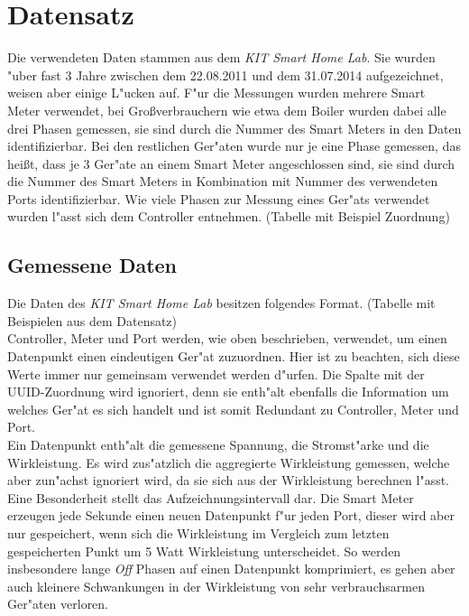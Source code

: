 \section{Datensatz}
\label{Datensatz}

Die verwendeten Daten stammen aus dem \textit{KIT Smart Home Lab}. Sie wurden "uber fast 3 Jahre zwischen dem 22.08.2011 und dem 31.07.2014 aufgezeichnet, weisen aber einige L"ucken auf. F"ur die Messungen wurden mehrere Smart Meter verwendet, bei Gro{\ss}verbrauchern wie etwa dem Boiler wurden dabei alle drei Phasen gemessen, sie sind durch die Nummer des Smart Meters in den Daten identifizierbar. Bei den restlichen Ger"aten wurde nur je eine Phase gemessen, das hei{\ss}t, dass je 3 Ger"ate an einem Smart Meter angeschlossen sind, sie sind durch die Nummer des Smart Meters in Kombination mit Nummer des verwendeten Ports identifizierbar. Wie viele Phasen zur Messung eines Ger"ats verwendet wurden l"asst sich dem Controller entnehmen. (Tabelle mit Beispiel Zuordnung)


\subsection{Gemessene Daten}
\label{Gemessene Daten}

Die Daten des \textit{KIT Smart Home Lab} besitzen folgendes Format. (Tabelle mit Beispielen aus dem Datensatz) \\

Controller, Meter und Port werden, wie oben beschrieben, verwendet, um einen Datenpunkt einen eindeutigen Ger"at zuzuordnen. Hier ist zu beachten, sich diese Werte immer nur gemeinsam verwendet werden d"urfen.
Die Spalte mit der UUID-Zuordnung wird ignoriert, denn sie enth"alt ebenfalls die Information um welches Ger"at es sich handelt und ist somit Redundant zu Controller, Meter und Port. \\
Ein Datenpunkt enth"alt die gemessene Spannung, die Stromst"arke und die Wirkleistung. Es wird zus"atzlich die aggregierte Wirkleistung gemessen, welche aber zun"achst ignoriert wird, da sie sich aus der Wirkleistung berechnen l"asst. \\
Eine Besonderheit stellt das Aufzeichnungsintervall dar. Die Smart Meter erzeugen jede Sekunde einen neuen Datenpunkt f"ur jeden Port, dieser wird aber nur gespeichert, wenn sich die Wirkleistung im Vergleich zum letzten gespeicherten Punkt um 5 Watt Wirkleistung unterscheidet. So werden insbesondere lange \textit{Off} Phasen auf einen Datenpunkt komprimiert, es gehen aber auch kleinere Schwankungen in der Wirkleistung von sehr verbrauchsarmen Ger"aten verloren.


